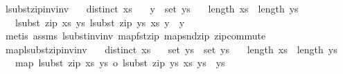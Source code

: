 \begin{isabellebody}
\endisatagproof
{\isafoldproof}%
%
\isadelimproof
\isanewline
%
\endisadelimproof
\isanewline
\isanewline
{}\isamarkupfalse%
\ lsubst{\isacharunderscore}{\kern0pt}zip{\isacharunderscore}{\kern0pt}inv{\isacharunderscore}{\kern0pt}inv{\isacharcolon}{\kern0pt}\isanewline
\ \ \ {\isachardoublequoteopen}distinct\ xs{\isachardoublequoteclose}\isanewline
\ \ \ {\isachardoublequoteopen}y\ {\isasymin}\ set\ ys{\isachardoublequoteclose}\isanewline
\ \ \ {\isachardoublequoteopen}length\ xs\ {\isacharequal}{\kern0pt}\ length\ ys{\isachardoublequoteclose}\isanewline
\ \ \ {\isachardoublequoteopen}lsubst\ {\isacharparenleft}{\kern0pt}zip\ xs\ ys{\isacharparenright}{\kern0pt}\ {\isacharparenleft}{\kern0pt}lsubst\ {\isacharparenleft}{\kern0pt}zip\ ys\ xs{\isacharparenright}{\kern0pt}\ y{\isacharparenright}{\kern0pt}\ {\isacharequal}{\kern0pt}\ y{\isachardoublequoteclose}\isanewline
%
\isadelimproof
%
\endisadelimproof
%
\isatagproof
{}\isamarkupfalse%
\ {\isacharparenleft}{\kern0pt}metis\ assms{\isacharparenleft}{\kern0pt}{}{\isacharcomma}{\kern0pt}{}{\isacharcomma}{\kern0pt}{}{\isacharparenright}{\kern0pt}\ lsubst{\isacharunderscore}{\kern0pt}inv{\isacharunderscore}{\kern0pt}inv\ map{\isacharunderscore}{\kern0pt}fst{\isacharunderscore}{\kern0pt}zip\ map{\isacharunderscore}{\kern0pt}snd{\isacharunderscore}{\kern0pt}zip\ zip{\isacharunderscore}{\kern0pt}commute{\isacharparenright}{\kern0pt}%
\endisatagproof
{\isafoldproof}%
%
\isadelimproof
\isanewline
%
\endisadelimproof
\isanewline
\isanewline
{}\isamarkupfalse%
\ map{\isacharunderscore}{\kern0pt}lsubst{\isacharunderscore}{\kern0pt}zip{\isacharunderscore}{\kern0pt}inv{\isacharunderscore}{\kern0pt}inv{\isacharcolon}{\kern0pt}\isanewline
\ \ \ {\isachardoublequoteopen}distinct\ xs{\isachardoublequoteclose}\isanewline
\ \ \ {\isachardoublequoteopen}set\ ys{\isacharprime}{\kern0pt}\ {\isasymsubseteq}\ set\ ys{\isachardoublequoteclose}\isanewline
\ \ \ {\isachardoublequoteopen}length\ xs\ {\isacharequal}{\kern0pt}\ length\ ys{\isachardoublequoteclose}\isanewline
\ \ \ {\isachardoublequoteopen}map\ {\isacharparenleft}{\kern0pt}lsubst\ {\isacharparenleft}{\kern0pt}zip\ xs\ ys{\isacharparenright}{\kern0pt}\ o\ lsubst\ {\isacharparenleft}{\kern0pt}zip\ ys\ xs{\isacharparenright}{\kern0pt}{\isacharparenright}{\kern0pt}\ ys{\isacharprime}{\kern0pt}\ {\isacharequal}{\kern0pt}\ ys{\isacharprime}{\kern0pt}{\isachardoublequoteclose}\isanewline

\end{isabellebody}

